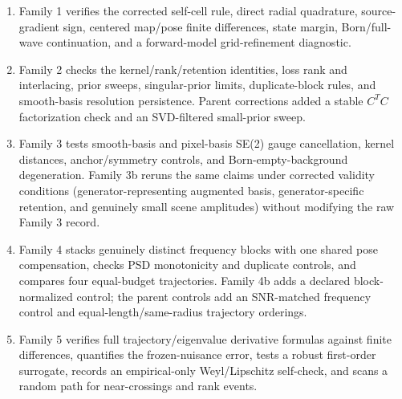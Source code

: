 \documentclass[12pt]{article}
\begin{document}
\begin{enumerate}
\item Family 1 verifies the corrected self-cell rule, direct radial
quadrature, source-gradient sign, centered map/pose finite differences, state
margin, Born/full-wave continuation, and a forward-model grid-refinement
diagnostic.
\item Family 2 checks the kernel/rank/retention identities, loss rank and
interlacing, prior sweeps, singular-prior limits, duplicate-block rules, and
smooth-basis resolution persistence. Parent corrections added a stable
$C^TC$ factorization check and an SVD-filtered small-prior sweep.
\item Family 3 tests smooth-basis and pixel-basis SE(2) gauge cancellation,
kernel distances, anchor/symmetry controls, and Born-empty-background
degeneration. Family 3b reruns the same claims under corrected validity
conditions (generator-representing augmented basis, generator-specific
retention, and genuinely small scene amplitudes) without modifying the raw
Family 3 record.
\item Family 4 stacks genuinely distinct frequency blocks with one shared
pose compensation, checks PSD monotonicity and duplicate controls, and
compares four equal-budget trajectories. Family 4b adds a declared
block-normalized control; the parent controls add an SNR-matched frequency
control and equal-length/same-radius trajectory orderings.
\item Family 5 verifies full trajectory/eigenvalue derivative formulas against
finite differences, quantifies the frozen-nuisance error, tests a robust
first-order surrogate, records an empirical-only Weyl/Lipschitz self-check,
and scans a random path for near-crossings and rank events.
\end{enumerate}
\end{document}
